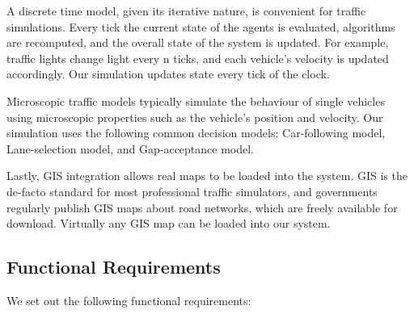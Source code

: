 \documentclass[11pt]{article}
\begin{document}
A discrete time model, given its iterative nature, is convenient for traffic simulations. Every tick the current state of the agents is evaluated, algorithms are recomputed, and the overall state of the system is updated. For example, traffic lights change light every n ticks, and each vehicle\textquoteright s velocity is updated accordingly. Our simulation updates state every tick of the clock.

Microscopic traffic models typically simulate the behaviour of single vehicles using microscopic properties such as the vehicle\textquoteright s position and velocity. Our simulation uses the following common decision models\cite{8h}: Car-following model, Lane-selection model, and Gap-acceptance model.

Lastly, GIS integration allows real maps to be loaded into the system. GIS is the de-facto standard for most professional traffic simulators, and governments regularly publish GIS maps about road networks, which are freely available for download. Virtually any GIS map can be loaded into our system.

\subsection{Functional Requirements}

We set out the following functional requirements:
\end{document}

